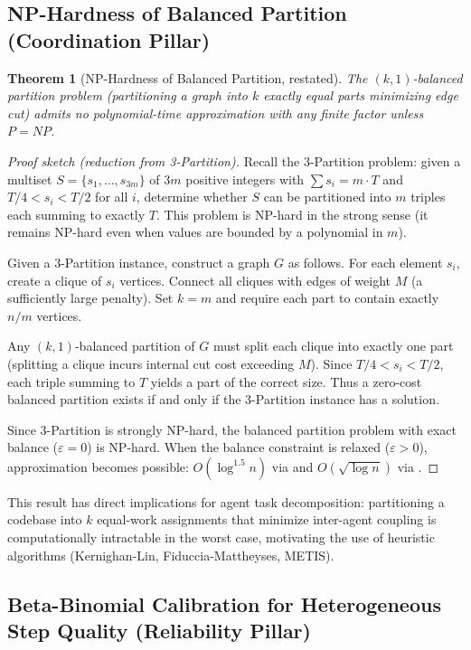 \documentclass[11pt, a4paper, logo, copyright]{googledeepmind}
\newtheorem{theorem}{Theorem}[section]
\begin{document}
\begin{appendices}
\subsection{NP-Hardness of Balanced Partition (Coordination Pillar)}

\begin{theorem}[NP-Hardness of Balanced Partition, restated]
The $(k, 1)$-balanced partition problem (partitioning a graph into $k$ exactly
equal parts minimizing edge cut) admits no polynomial-time approximation with
any finite factor unless $P = NP$.
\end{theorem}

\begin{proof}[Proof sketch (reduction from 3-Partition)]
Recall the 3-Partition problem: given a multiset $S = \{s_1, \ldots, s_{3m}\}$
of $3m$ positive integers with $\sum s_i = m \cdot T$ and $T/4 < s_i < T/2$
for all $i$, determine whether $S$ can be partitioned into $m$ triples each
summing to exactly $T$. This problem is NP-hard in the strong sense
(it remains NP-hard even when values are bounded by a polynomial in $m$).

Given a 3-Partition instance, construct a graph $G$ as follows.
For each element $s_i$, create a clique of $s_i$ vertices.
Connect all cliques with edges of weight $M$ (a sufficiently large penalty).
Set $k = m$ and require each part to contain exactly $n/m$ vertices.

Any $(k, 1)$-balanced partition of $G$ must split each clique into exactly
one part (splitting a clique incurs internal cut cost exceeding $M$).
Since $T/4 < s_i < T/2$, each triple summing to $T$ yields a part of the
correct size. Thus a zero-cost balanced partition exists if and only if
the 3-Partition instance has a solution.

Since 3-Partition is strongly NP-hard, the balanced partition problem
with exact balance ($\varepsilon = 0$) is NP-hard. When the balance constraint
is relaxed ($\varepsilon > 0$), approximation becomes possible:
$O(\log^{1.5} n)$ via \citet{AndreevRacke2006} and
$O(\sqrt{\log n})$ via \citet{AroraRaoVazirani2009}.
\end{proof}

This result has direct implications for agent task decomposition:
partitioning a codebase into $k$ equal-work assignments that minimize
inter-agent coupling is computationally intractable in the worst case,
motivating the use of heuristic algorithms (Kernighan-Lin, Fiduccia-Mattheyses, METIS).


\subsection{Beta-Binomial Calibration for Heterogeneous Step Quality (Reliability Pillar)}


\end{appendices}
\end{document}
